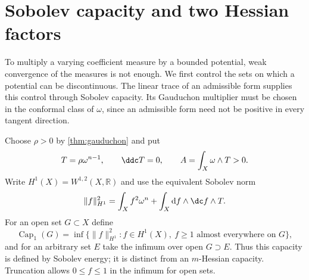 \section{Sobolev capacity and two Hessian factors}
\label{sec:hessian-sobolev-two-factors}

To multiply a varying coefficient measure by a bounded potential,
weak convergence of the measures is not enough. We first control the
sets on which a potential can be discontinuous. The linear trace of
an admissible form supplies this control through Sobolev capacity.
Its Gauduchon multiplier must be chosen in the conformal class of
$\omega$, since an admissible form need not be positive in every
tangent direction.

Choose $\rho>0$ by \cref{thm:gauduchon} and put
\[
 T=\rho\omega^{n-1},\qquad \ddc T=0,\qquad
 A=\int_X\omega\wedge T>0.
\]
Write $H^1(X)=W^{1,2}(X,\mathbb R)$ and use the equivalent Sobolev norm
\[
 \|f\|_{H^1}^2=\int_Xf^2\omega^n+
                   \int_X\mathrm df\wedge\dc f\wedge T.
\]
For an open set $G\subset X$ define
\[
 \operatorname{Cap}_1(G)
 =\inf\{\|f\|_{H^1}^2:f\in H^1(X),\ f\geq1
                          \text{ almost everywhere on }G\},
\]
and for an arbitrary set $E$ take the infimum over open $G\supset E$.
Thus this capacity is defined by Sobolev energy; it is distinct from
an $m$-Hessian capacity. Truncation allows $0\leq f\leq1$ in the
infimum for open sets.

